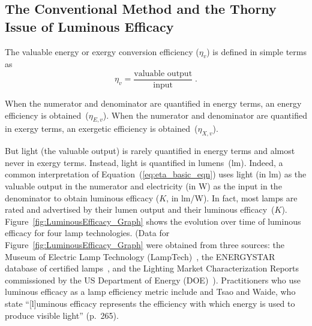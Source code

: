\documentclass[energies,article,accept,moreauthors,pdftex]{Definitions/mdpi}\usepackage[]{graphicx}\usepackage[]{color}
\newcommand{\ins}[1]{#1}
\newcommand{\enoex}{energy or exergy}
\providecommand{\DIFaddbegin}{} %
\providecommand{\DIFaddend}{} %
\newcommand{\DIFaddincludegraphics}[2][]{{\color{blue}\fbox{\DIFOincludegraphics[#1]{#2}}}} %
\DeclareRobustCommand{\DIFaddbegin}{\DIFOaddbegin \let\includegraphics\DIFaddincludegraphics} %
\DeclareRobustCommand{\DIFaddend}{\DIFOaddend \let\includegraphics\DIFOincludegraphics} %
\begin{document}
\subsection{The Conventional Method and the Thorny Issue of Luminous Efficacy}
\label{sec:conventional_method}

The valuable \enoex{} conversion efficiency ($\eta_v$)
is defined in simple terms as
\begin{equation} \label{eq:eta_basic_eqn}
 \eta_v = \frac{\text{valuable output}}{\text{input}} \; .
\end{equation}

When the numerator and denominator are quantified in energy terms,
an energy efficiency is obtained~($\eta_{E,v}$).
When the numerator and denominator are quantified in exergy terms,
an exergetic efficiency is obtained~($\eta_{X,v}$).

But light (the valuable output) is rarely quantified in energy terms
and almost never in exergy terms.
Instead, light is quantified in lumens~(lm).
Indeed, a common interpretation of \mbox{Equation~(\ref{eq:eta_basic_eqn})} uses
light (in lm) as the valuable output in the numerator and 
electricity (in W) as the input in the denominator
to obtain luminous efficacy ($K$, in lm/W).
In fact, most lamps are rated and advertised by their lumen output and their luminous efficacy~($K$).
Figure~\ref{fig:LuminousEfficacy_Graph} shows the evolution over time 
of luminous efficacy for four lamp technologies.
\DIFaddbegin \ins{(Data for Figure~\ref{fig:LuminousEfficacy_Graph} were obtained from three sources: 
the Museum of Electric Lamp Technology (LampTech)~\cite{hooker_2020}, 
the ENERGYSTAR database of certified lamps~\cite{energystar_2020}, and 
the Lighting Market Characterization Reports commissioned by the 
US Department of Energy (DOE)~\cite{DOE2002, DOE2012, DOE2017}).}
\DIFaddend Practitioners who use luminous efficacy 
as a lamp efficiency metric include \citet{Nordhaus1996} and
Tsao and Waide, 
who state 
``[l]uminous efficacy represents the efficiency 
with which energy is used to produce visible light'' \citep{Tsao2010appetitelight} (p.~265).
\end{document}
